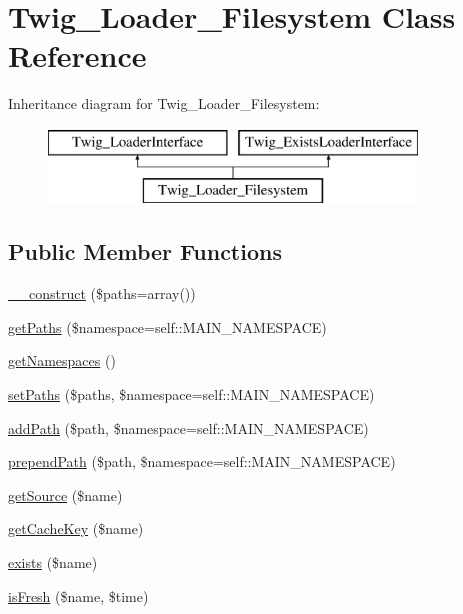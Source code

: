 \hypertarget{classTwig__Loader__Filesystem}{}\section{Twig\+\_\+\+Loader\+\_\+\+Filesystem Class Reference}
\label{classTwig__Loader__Filesystem}
Inheritance diagram for Twig\+\_\+\+Loader\+\_\+\+Filesystem\+:\begin{figure}[H]
\begin{center}
\leavevmode
\includegraphics[height=2.000000cm]{classTwig__Loader__Filesystem}
\end{center}
\end{figure}
\subsection*{Public Member Functions}
\begin{DoxyCompactItemize}
\item 
\hyperlink{classTwig__Loader__Filesystem_a746a9eb85e6dda7faa53faff286afb83}{\+\_\+\+\_\+construct} (\$paths=array())
\item 
\hyperlink{classTwig__Loader__Filesystem_ab10da22ac700428bff81e564375e9ffa}{get\+Paths} (\$namespace=self\+::\+M\+A\+I\+N\+\_\+\+N\+A\+M\+E\+S\+P\+A\+CE)
\item 
\hyperlink{classTwig__Loader__Filesystem_abc27b1703be40cb8dd8a1a0c5aeaa859}{get\+Namespaces} ()
\item 
\hyperlink{classTwig__Loader__Filesystem_a1d95fd0f4985e79cd29c62e49c3aa5d4}{set\+Paths} (\$paths, \$namespace=self\+::\+M\+A\+I\+N\+\_\+\+N\+A\+M\+E\+S\+P\+A\+CE)
\item 
\hyperlink{classTwig__Loader__Filesystem_a5454d33ddcfed418f776ba17ae239635}{add\+Path} (\$path, \$namespace=self\+::\+M\+A\+I\+N\+\_\+\+N\+A\+M\+E\+S\+P\+A\+CE)
\item 
\hyperlink{classTwig__Loader__Filesystem_a28cfe9d3519049bc41f728b3b069b3c2}{prepend\+Path} (\$path, \$namespace=self\+::\+M\+A\+I\+N\+\_\+\+N\+A\+M\+E\+S\+P\+A\+CE)
\item 
\hyperlink{classTwig__Loader__Filesystem_a88edb359da4f65ccf5ecb68156c2b870}{get\+Source} (\$name)
\item 
\hyperlink{classTwig__Loader__Filesystem_a33896b87ff6eea5dd9df7a146aaffd59}{get\+Cache\+Key} (\$name)
\item 
\hyperlink{classTwig__Loader__Filesystem_a014a09fdc88a29129bd9a9a65d979e9f}{exists} (\$name)
\item 
\hyperlink{classTwig__Loader__Filesystem_a711f91783346edac8b4c645804c8ecfe}{is\+Fresh} (\$name, \$time)
\end{DoxyCompactItemize}

